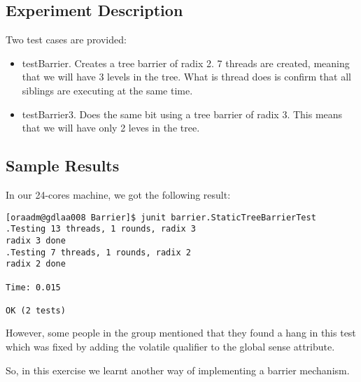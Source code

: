 \subsection{Experiment Description}
\par
Two test cases are provided:
\par
\begin{itemize}
\item testBarrier. Creates a tree barrier of radix 2. 7 threads are created,
meaning that we will have 3 levels in the tree. What is thread does is confirm
that all siblings are executing at the same time. 
\item testBarrier3. Does the same bit using a tree barrier of radix 3. This
means that we will have only 2 leves in the tree.
\end{itemize}
\par
\subsection{Sample Results}
\par
In our 24-cores machine, we got the following result:
\par
\hfill
\begin{verbatim}
[oraadm@gdlaa008 Barrier]$ junit barrier.StaticTreeBarrierTest
.Testing 13 threads, 1 rounds, radix 3
radix 3 done
.Testing 7 threads, 1 rounds, radix 2
radix 2 done

Time: 0.015

OK (2 tests)
\end{verbatim}
\hfill
\par
However, some people in the group mentioned that they found a hang in this test
which was fixed by adding the volatile qualifier to the global sense attribute.
\par
So, in this exercise we learnt another way of implementing a barrier mechanism.
\par
